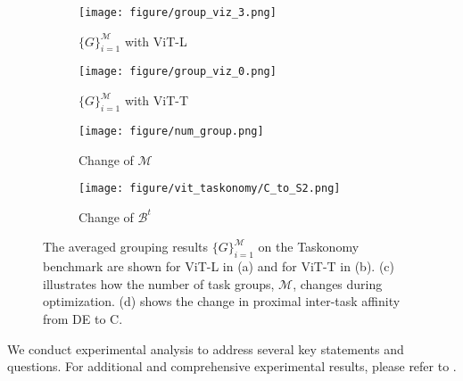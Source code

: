 \begin{figure}[t]
    \vspace{-10pt}
    \centering
    \begin{subfigure}{0.24\textwidth}
        \texttt{[image: figure/group\_viz\_3.png]}
        \vspace*{-15pt}
        \caption{$\{G\}_{i=1}^{\mathcal{M}}$ with ViT-L}
        \label{fig:group_viz_T}
    \end{subfigure}
    \begin{subfigure}{0.24\textwidth}
        \texttt{[image: figure/group\_viz\_0.png]}
        \vspace*{-15pt}
        \caption{$\{G\}_{i=1}^{\mathcal{M}}$ with ViT-T}
        \label{fig:group_viz_L}
    \end{subfigure}
        \begin{subfigure}{0.24\textwidth}
        \texttt{[image: figure/num\_group.png]}
        \vspace*{-15pt}
        \caption{Change of $\mathcal{M}$}
        \label{fig:num_group}
    \end{subfigure}
        \begin{subfigure}{0.24\textwidth}
        \texttt{[image: figure/vit\_taskonomy/C\_to\_S2.png]}
        \vspace*{-15pt}
        \caption{Change of $\mathcal{B}^t$}
        \label{fig:viz_prox}
    \end{subfigure}
    \vspace{-5pt}
    \caption{The averaged grouping results $\{G\}_{i=1}^{\mathcal{M}}$ on the Taskonomy benchmark are shown for ViT-L in (a) and for ViT-T in (b). (c) illustrates how the number of task groups, $\mathcal{M}$, changes during optimization. (d) shows the change in proximal inter-task affinity from DE to C.}
    \label{fig:vis}
    \vspace{-8pt}
\end{figure}



We conduct experimental analysis to address several key statements and questions. For additional and comprehensive experimental results, please refer to .

